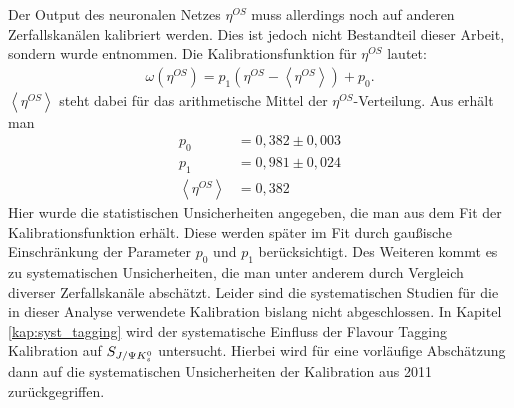 Der Output des neuronalen Netzes $\eta^{OS}$ muss allerdings noch auf anderen Zerfallskanälen kalibriert werden. Dies ist jedoch nicht Bestandteil dieser Arbeit, sondern wurde \cite{tagging} entnommen. Die Kalibrationsfunktion für $\eta^{OS}$ lautet:
\begin{align}
\omega(\eta^{OS}) = p_1\left(\eta^{OS}-\left\langle \eta^{OS} \right\rangle\right) + p_0 .
\end{align}
$\left\langle \eta^{OS} \right\rangle$ steht dabei für das arithmetische Mittel der $\eta^{OS}$-Verteilung. Aus \cite{tagging} erhält man
\begin{align}
p_0 &= 0,382 \pm 0,003 \\
p_1 &= 0,981 \pm 0,024 \\
\left\langle \eta^{OS} \right\rangle &= 0,382
\end{align}
Hier wurde die statistischen Unsicherheiten angegeben, die man aus dem Fit der Kalibrationsfunktion erhält. Diese werden später im Fit durch gaußische Einschränkung der Parameter $p_0$ und $p_1$ berücksichtigt. Des Weiteren kommt es zu systematischen Unsicherheiten, die man unter anderem durch Vergleich diverser Zerfallskanäle abschätzt. Leider sind die systematischen Studien für die in dieser Analyse verwendete Kalibration bislang nicht abgeschlossen. In Kapitel \ref{kap:syst_tagging} wird der systematische Einfluss der Flavour Tagging Kalibration auf  $S_{J/\Psi K_s^0}$ untersucht. Hierbei wird für eine vorläufige Abschätzung dann auf die systematischen Unsicherheiten der Kalibration aus 2011 \cite{lhcb-paper} zurückgegriffen.

